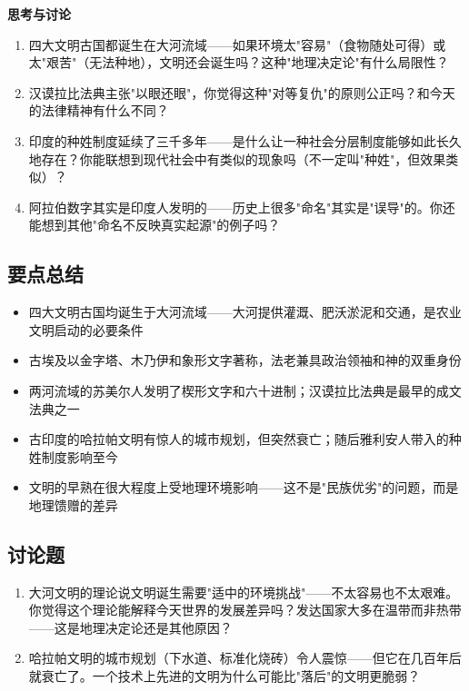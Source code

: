 \documentclass[a4paper,12pt]{ctexart}
\begin{document}
\vspace{0.3cm}
{\large\textcolor{orange!80!black}{\textbf{思考与讨论}}}
\begin{enumerate}
  \item 四大文明古国都诞生在大河流域——如果环境太"容易"（食物随处可得）或太"艰苦"（无法种地），文明还会诞生吗？这种"地理决定论"有什么局限性？
  \item 汉谟拉比法典主张"以眼还眼"，你觉得这种"对等复仇"的原则公正吗？和今天的法律精神有什么不同？
  \item 印度的种姓制度延续了三千多年——是什么让一种社会分层制度能够如此长久地存在？你能联想到现代社会中有类似的现象吗（不一定叫"种姓"，但效果类似）？
  \item 阿拉伯数字其实是印度人发明的——历史上很多"命名"其实是"误导"的。你还能想到其他"命名不反映真实起源"的例子吗？
\end{enumerate}

\subsection*{要点总结}
\begin{itemize}
  \item 四大文明古国均诞生于大河流域——大河提供灌溉、肥沃淤泥和交通，是农业文明启动的必要条件
  \item 古埃及以金字塔、木乃伊和象形文字著称，法老兼具政治领袖和神的双重身份
  \item 两河流域的苏美尔人发明了楔形文字和六十进制；汉谟拉比法典是最早的成文法典之一
  \item 古印度的哈拉帕文明有惊人的城市规划，但突然衰亡；随后雅利安人带入的种姓制度影响至今
  \item 文明的早熟在很大程度上受地理环境影响——这不是"民族优劣"的问题，而是地理馈赠的差异
\end{itemize}

\subsection*{讨论题}
\begin{enumerate}
  \item 大河文明的理论说文明诞生需要"适中的环境挑战"——不太容易也不太艰难。你觉得这个理论能解释今天世界的发展差异吗？发达国家大多在温带而非热带——这是地理决定论还是其他原因？
  \item 哈拉帕文明的城市规划（下水道、标准化烧砖）令人震惊——但它在几百年后就衰亡了。一个技术上先进的文明为什么可能比"落后"的文明更脆弱？
\end{enumerate}
\end{document}

